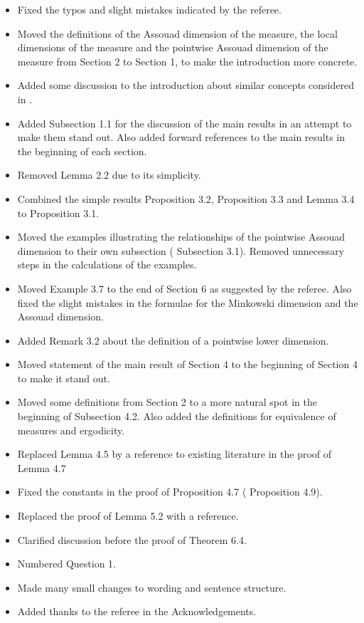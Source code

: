 \documentclass[12pt]{amsart}
\numberwithin{equation}{section}
\newcommand{\old}[1]{{\color{red} #1}}
\newcommand{\new}[1]{{\color{blue} #1}}
\theoremstyle{plain}
\theoremstyle{definition}
\theoremstyle{remark}
\begin{document}
\begin{itemize}
    \item Fixed the typos and slight mistakes indicated by the referee.
    \item Moved the definitions of the Assouad dimension of the measure, the local dimensions of the measure and the pointwise Assouad dimension of the measure from \old{Section 2} to \new{Section 1}, to make the introduction more concrete.
    \item Added some discussion to the introduction about similar concepts considered in \cite{BBL}.
    \item Added \new{Subsection 1.1} for the discussion of the main results in an attempt to make them stand out. Also added forward references to the main results in the beginning of each section.
    \item Removed \old{Lemma 2.2} due to its simplicity.
    \item Combined the simple results \old{Proposition 3.2}, \old{Proposition 3.3} and \old{Lemma 3.4} to \new{Proposition 3.1}.
    \item Moved the examples illustrating the relationships of the pointwise Assouad dimension to their own subsection (\new{Subsection 3.1}). Removed unnecessary steps in the calculations of the examples.
    \item Moved \old{Example 3.7} to the end of \new{Section 6} as suggested by the referee. Also fixed the slight mistakes in the formulae for the Minkowski dimension and the Assouad dimension.
    \item Added \new{Remark 3.2} about the definition of a pointwise lower dimension.
    \item Moved statement of the main result of \old{Section 4} to the beginning of \new{Section 4} to make it stand out.
    \item Moved some definitions from \old{Section 2} to a more natural spot in the beginning of \new{Subsection 4.2}. Also added the definitions for equivalence of measures and ergodicity.
    \item Replaced \old{Lemma 4.5} by a reference to existing literature in the proof of \new{Lemma 4.7}
    \item Fixed the constants in the proof of \old{Proposition 4.7} (\new{Proposition 4.9}).
    \item Replaced the proof of Lemma 5.2 with a reference.
    \item Clarified discussion before the proof of \new{Theorem 6.4}.
    \item Numbered \new{Question 1}.
    \item Made many small changes to wording and sentence structure.
    \item Added thanks to the referee in the Acknowledgements.
\end{itemize}



\end{document}
